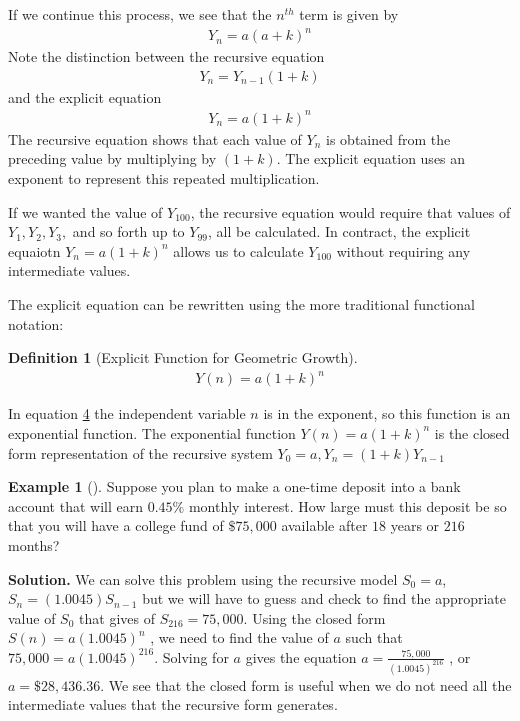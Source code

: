 \documentclass[10pt,]{book}
\theoremstyle{plain}
\theoremstyle{definition}
\newtheorem{definition}[theorem]{Definition}
\theoremstyle{definition}
\newtheorem{example}[theorem]{Example}
\theoremstyle{definition}
\numberwithin{equation}{section}
\begin{document}
\hypertarget{p-87}{}%
If we continue this process, we see that the \(n^{th}\) term is given by%
%
\begin{gather*}
Y_n=a(a+k)^n
\end{gather*}
\hypertarget{p-88}{}%
Note the distinction between the recursive equation%
%
\begin{gather*}
Y_n=Y_{n-1}(1+k)
\end{gather*}
\hypertarget{p-89}{}%
and the explicit equation%
%
\begin{gather*}
Y_n=a(1+k)^n
\end{gather*}
\hypertarget{p-90}{}%
The recursive equation shows that each value of \(Y_n\)  is obtained from the preceding value by multiplying by \((1+k)\). The explicit equation uses an exponent to represent this repeated multiplication.%
\par
\hypertarget{p-91}{}%
If we wanted the value of \(Y_{100}\), the recursive equation would require that values of \(Y_1, Y_2, Y_3,\) and so forth up to \(Y_{99}\),  all be calculated. In contract, the explicit equaiotn \(Y_n=a(1+k)^n\) allows us to calculate \(Y_{100}\) without requiring any intermediate values.%
\par
\hypertarget{p-92}{}%
The explicit equation can be rewritten using the more traditional functional notation:%
\begin{definition}[{Explicit Function for Geometric Growth}]\label{explicit-geometric-growth-equation}
%
\begin{gather*}
Y(n)=a(1+k)^n
\end{gather*}
\end{definition}
\hypertarget{p-93}{}%
In equation \hyperref[explicit-geometric-growth-equation]{4} the independent variable \(n\) is in the exponent, so this function is an exponential function. The exponential function \(Y(n)=a(1+k)^n\) is the closed form representation of the recursive system  \(Y_0=a,Y_n=(1+k)Y_{n-1}\)%
\begin{example}[]\label{example-one-time-bank-desposit}
\hypertarget{p-94}{}%
Suppose you plan to make a one-time deposit into a bank account that will earn \(0.45\%\) monthly interest.  How large must this deposit be so that you will have a college fund of \(\$75,000\) available after \(18\) years or \(216\) months?%
\par\smallskip%
\noindent\textbf{Solution.}\hypertarget{solution-7}{}\quad%
\hypertarget{p-95}{}%
We can solve this problem using the recursive model \(S_0 = a\), \(S_n = (1.0045) S_{n-1}\) but we will have to guess and check to find the appropriate value of \(S_0\) that gives of \(S_{216} = 75,000\).  Using the closed form \(S(n)=a(1.0045)^n\) , we need to find the value of \(a\) such that \(75,000 = a (1.0045)^{216}\).  Solving for \(a\) gives the equation \(a = \frac{75,000}{(1.0045)^{216}}\) , or \(a = \$28,436.36\).  We see that the closed form is useful when we do not need all the intermediate values that the recursive form generates.%
\end{example}
\end{document}
